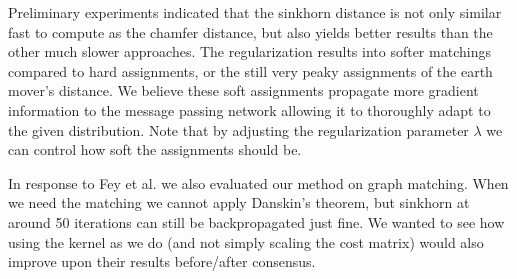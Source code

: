 Preliminary experiments indicated that the sinkhorn distance is not only similar fast to compute as the chamfer distance, but also yields better results than the other much slower approaches. The regularization results into softer matchings compared to hard assignments, or the still very peaky assignments of the earth mover's distance. We believe these soft assignments propagate more gradient information to the message passing network allowing it to thoroughly adapt to the given distribution. Note that by adjusting the regularization parameter $\lambda$ we can control how soft the assignments should be.

In response to Fey et al. we also evaluated our method on graph matching. When we need the matching we cannot apply Danskin's theorem, but sinkhorn at around 50 iterations can still be backpropagated just fine. We wanted to see how using the kernel as we do (and not simply scaling the cost matrix) would also improve upon their results before/after consensus.

